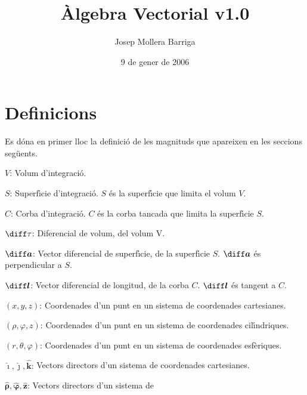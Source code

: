 \documentclass[catalan,a4paper,twoside,11pt]{article}
\begin{document}
\title{\`{A}lgebra Vectorial v1.0}
\author{Josep Mollera Barriga}
\date{9 de gener de 2006}
\maketitle

\begin{multicols}{2}
\scriptsize \tableofcontents
\end{multicols}

\section{Definicions}

Es d\'{o}na  en primer lloc la definici\'{o} de les magnituds que
apareixen en les seccions seg\"{u}ents.

\begin{list}{}
{\setlength{\labelwidth}{14mm}
\setlength{\leftmargin}{16mm}\setlength{\labelsep}{2mm}}
   \item[$V$:] Volum d'integraci\'{o}.
   \item[$S$:]  Superf\'{\i}cie d'integraci\'{o}. $S$ \'{e}s la superf\'{\i}cie que
   limita el volum $V$.
   \item[$C$:] Corba d'integraci\'{o}. $C$ \'{e}s la corba tancada que
   limita la superf\'{\i}cie $S$.
   \item[$\diff\tau$:] Diferencial de volum, del volum V.
   \item[$\boldsymbol{\diff a}$:] Vector diferencial de superf\'{\i}cie, de la superf\'{\i}cie
   $S$. $\boldsymbol{\diff a}$ \'{e}s perpendicular a $S$.
   \item[$\boldsymbol{\diff l}$:] Vector diferencial de longitud, de la corba
   $C$. $\boldsymbol{\diff l}$ \'{e}s tangent a $C$.
   \item[$(x,y,z)$:] Coordenades d'un punt en un sistema de
   coordenades cartesianes.
   \item[$(\rho,\varphi,z)$:] Coordenades d'un punt en un sistema de
   coordenades cil\'{\i}ndriques.
   \item[$(r,\theta,\varphi)$:] Coordenades d'un punt en un sistema de
   coordenades esf\`{e}riques.
   \item[$\boldsymbol{\hat{\imath}},\boldsymbol{\hat{\jmath}},\boldsymbol{\hat{k}}$:]
   Vectors directors d'un sistema de  coordenades
   cartesianes.
   \item[$\boldsymbol{\hat{\rho}},\boldsymbol{\hat{\varphi}},\boldsymbol{\hat{z}}$:] Vectors directors d'un sistema de

\end{list}
\end{document}
